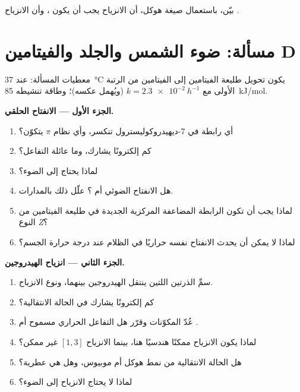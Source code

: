 \begin{exercise}[$\star\star\star$]\label{exo:b3:pericyclic:12}
بيّن، باستعمال صيغة هوكل، أن الانزياح  يجب أن يكون ،
وأن الانزياح  .
\end{exercise}

\clearpage
\enlargethispage{3\baselineskip}
\section{مسألة: ضوء الشمس والجلد والفيتامين D}

\begin{problem}
\label{pb:b3:pericyclic:1}
معطيات المسألة: عند \qty{37}{\celsius} يكون تحويل طليعة الفيتامين  إلى الفيتامين 
من الرتبة الأولى مع $k = \qty{2.3e-2}{h^{-1}}$ (ويُهمل عكسه)؛ وطاقة تنشيطه
\qty{85}{kJ/mol}.

\medskip\noindent\textbf{الجزء الأول --- الانفتاح الحلقي.}
\begin{enumerate}
  \item أي رابطة في 7-ديهيدروكوليسترول تنكسر، وأي نظام $\pi$ يتكوّن؟
  \item كم إلكترونًا يشارك، وما عائلة التفاعل؟
  \item لماذا يحتاج إلى الضوء؟
  \item هل الانفتاح الضوئي  أم ؟ علّل ذلك
        بالمدارات.
  \item لماذا يجب أن تكون الرابطة المضاعفة المركزية الجديدة في طليعة الفيتامين  من النوع \textit{Z}؟
  \item لماذا لا يمكن أن يحدث الانفتاح نفسه حراريًا في الظلام عند درجة حرارة الجسم؟
\end{enumerate}

\medskip\noindent\textbf{الجزء الثاني --- انزياح الهيدروجين.}
\begin{enumerate}[resume]
  \item سمِّ الذرتين اللتين ينتقل الهيدروجين بينهما، ونوع الانزياح.
  \item كم إلكترونًا يشارك في الحالة الانتقالية؟
  \item عُدّ المكوّنات وقرّر هل التفاعل الحراري مسموح  أم .
  \item لماذا يكون الانزياح  ممكنًا هندسيًا هنا، بينما الانزياح $[1,3]$
        غير ممكن؟
  \item هل الحالة الانتقالية من نمط هوكل أم موبيوس، وهل هي عطرية؟
  \item لماذا لا يحتاج الانزياح إلى الضوء؟
\end{enumerate}


\end{problem}
